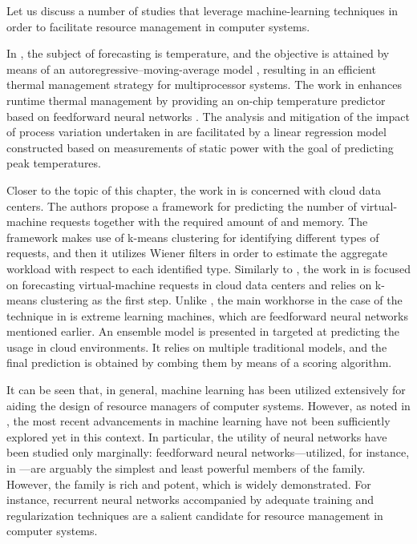 Let us discuss a number of studies that leverage machine-learning techniques in
order to facilitate resource management in computer systems.

In \cite{coskun2008}, the subject of forecasting is temperature, and the
objective is attained by means of an autoregressive--moving-average model
\cite{hastie2013}, resulting in an efficient thermal management strategy for
multiprocessor systems. The work in \cite{kumar2010} enhances runtime thermal
management by providing an on-chip temperature predictor based on feedforward
neural networks \cite{hastie2013}. The analysis and mitigation of the impact of
process variation undertaken in \cite{juan2014} are facilitated by a linear
regression model \cite{hastie2013} constructed based on measurements of static
power with the goal of predicting peak temperatures.

Closer to the topic of this chapter, the work in \cite{dabbagh2015} is concerned
with cloud data centers. The authors propose a framework for predicting the
number of virtual-machine requests together with the required amount of 
and memory. The framework makes use of k-means clustering \cite{hastie2013} for
identifying different types of requests, and then it utilizes Wiener filters in
order to estimate the aggregate workload with respect to each identified type.
Similarly to \cite{dabbagh2015}, the work in \cite{ismaeel2015} is focused on
forecasting virtual-machine requests in cloud data centers and relies on k-means
clustering as the first step. Unlike \cite{dabbagh2015}, the main workhorse in
the case of the technique in \cite{ismaeel2015} is extreme learning machines,
which are feedforward neural networks mentioned earlier. An ensemble model
\cite{hastie2013} is presented in \cite{cao2014} targeted at predicting the
 usage in cloud environments. It relies on multiple traditional models,
and the final prediction is obtained by combing them by means of a scoring
algorithm.

It can be seen that, in general, machine learning has been utilized extensively
for aiding the design of resource managers of computer systems. However, as
noted in , the most recent advancements in machine
learning have not been sufficiently explored yet in this context. In particular,
the utility of neural networks have been studied only marginally: feedforward
neural networks---utilized, for instance, in \cite{kumar2010, ismaeel2015}---are
arguably the simplest and least powerful members of the family. However, the
family is rich and potent, which is widely demonstrated. For instance, recurrent
neural networks accompanied by adequate training and regularization techniques
\cite{goodfellow2016} are a salient candidate for resource management in
computer systems.

